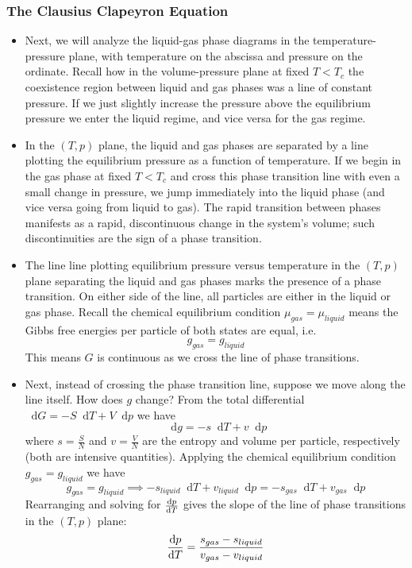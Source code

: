 \documentclass[11pt, a4paper]{article}
\newcommand{\diff}{\mathop{}\!\mathrm{d}} %
\begin{document}
\subsubsection{The Clausius Clapeyron Equation}
\begin{itemize}
	\item Next, we will analyze the liquid-gas phase diagrams in the temperature-pressure plane, with temperature on the abscissa and pressure on the ordinate. Recall how in the volume-pressure plane at fixed $ T < T_{c} $ the coexistence region between liquid and gas phases was a line of constant pressure. If we just slightly increase the pressure above the equilibrium pressure we enter the liquid regime, and vice versa for the gas regime. 
	
	\item In the $ (T, p) $ plane, the liquid and gas phases are separated by a line plotting the equilibrium pressure as a function of temperature. If we begin in the gas phase at fixed $ T < T_{c} $ and cross this phase transition line with even a small change in pressure, we jump immediately into the liquid phase (and vice versa going from liquid to gas). The rapid transition between phases manifests as a rapid, discontinuous change in the system's volume; such discontinuities are the sign of a phase transition. 
	
	\item The line line plotting equilibrium pressure versus temperature in the $ (T, p) $ plane separating the liquid and gas phases marks the presence of a phase transition. On either side of the line, all particles are either in the liquid or gas phase. Recall the chemical equilibrium condition $ \mu_{gas} = \mu_{liquid} $ means the Gibbs free energies per particle of both states are equal, i.e.
	\begin{equation*}
		 g_{gas} = g_{liquid} 
	\end{equation*}
	This means $ G $ is continuous as we cross the line of phase transitions. 
	
	\item Next, instead of crossing the phase transition line, suppose we move along the line itself. How does $ g $ change? From the total differential $ \diff G = -S \diff T + V\diff p  $ we have
	\begin{equation*}
		\diff g = - s \diff T + v \diff p
	\end{equation*}
	where $ s = \frac{S}{N}$ and $ v = \frac{V}{N} $ are the entropy and volume per particle, respectively (both are intensive quantities).
	Applying the chemical equilibrium condition $ g_{gas} = g_{liquid}  $ we have
	\begin{equation*}
		g_{gas} = g_{liquid} \implies - s_{liquid} \diff T + v_{liquid} \diff p = - s_{gas} \diff T + v_{gas} \diff p
	\end{equation*}
	Rearranging and solving for $ \dv{p}{T} $ gives the slope of the line of phase transitions in the $ (T, p) $ plane:
	\begin{equation*}
		\dv{p}{T} = \frac{s_{gas} - s_{liquid}}{v_{gas} - v_{liquid}}
	\end{equation*}
	

\end{itemize}
\end{document}
